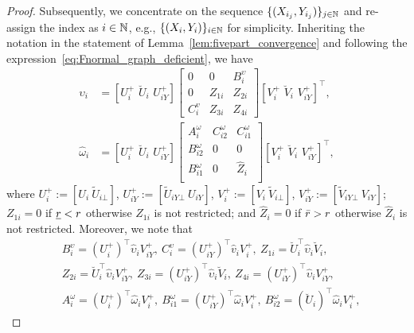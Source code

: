 \begin{proof}
    Subsequently, we concentrate on the sequence $\{(X_{i_j},Y_{i_j})\}_{j\in\mathbb{N}}$ and re-assign the index as $i\in\mathbb{N}$, e.g., $\{(X_i,Y_i)\}_{i\in\mathbb{N}}$ for simplicity. Inheriting the notation in the statement of Lemma~\ref{lem:fivepart_convergence} and following the expression~\eqref{eq:Fnormal_graph_deficient}, we have
    \begin{equation*}
        \begin{aligned}
            \hat{\upsilon}_i &=  \left[ U_{i}^{+}\,\,\breve{U}_i\,\,U_{iY}^{+} \right] \left[ \begin{matrix}
                0 & 0 & B_i^{\upsilon} \\
                0 & Z_{1i} & Z_{2i}\\
                C^v_i & Z_{3i} & Z_{4i}
            \end{matrix} \right] \left[ V_{i}^{+}\,\,\breve{V}_i\,\,V_{iY}^{+} \right] ^{\top},
           \\
           \hat{\omega}_i &= \left[ U_{i}^{+}\,\,\breve{U}_i\,\,U_{iY}^{+} \right] \left[ \begin{matrix}
            	A_{i}^{\omega}&		C_{i2}^{\omega}&		C_{i1}^{\omega}\\
            	B_{i2}^{\omega}&		0&		0\\
            	B_{i1}^{\omega}&		0&		\hat{Z}_i\\
            \end{matrix} \right] \left[ V_{i}^{+}\,\,\breve{V}_i\,\,V_{iY}^{+} \right] ^{\top},
        \end{aligned}
    \end{equation*}
    where $U^+_i:=[U_i\ \tilde{U}_{i\bot}]$, $U^+_{iY}:=[\tilde{U}_{iY\bot}\ U_{iY}]$, $V^+_i:=[V_i\ \tilde{V}_{i\bot}]$, $V^+_{iY}:=[\tilde{V}_{iY\bot}\ V_{iY}]$; $Z_{1i}=0$ if ${\underline{r}}<r$ otherwise $Z_{1i}$ is not restricted; and $\hat{Z}_i=0$ if $\bar{r}>r$ otherwise $\hat{Z}_i$ is not restricted. Moreover, we note that
    \begin{equation*}
        \begin{aligned}
            &B^\upsilon_i=(U^+_i)^\top \hat{\upsilon}_iV^+_{iY},\  C^\upsilon_i=(U^+_{iY})^\top\hat{v}_iV_i^+,\ Z_{1i}=\breve{U}_i ^{\top}\hat{\upsilon}_i\breve{V}_i,
            \\
            & Z_{2i}=\breve{U}_i ^{\top}\hat{\upsilon}_i{V}_{iY}^{+},\ Z_{3i}=({U}_{iY}^{+})^{\top}\hat{\upsilon}_i\breve{V}_i,\ Z_{4i}=({U}_{iY}^{+})^{\top}\hat{\upsilon}_i{V}_{iY}^{+},
            \\
            & A_{i}^{\omega}=( U_{i}^{+} ) ^{\top}\hat\omega _iV_{i}^{+} ,\ B_{i1}^{\omega}=( U_{iY}^{+} ) ^{\top}\hat\omega _i V_{i}^{+} ,\ B_{i2}^{\omega}=( \breve{U}_i ) ^{\top}\hat\omega _i V_{i}^{+} , 

\end{aligned}
\end{equation*}
\end{proof}
